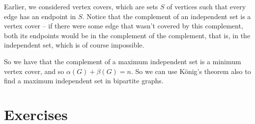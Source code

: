 \documentclass[nobib]{tufte-handout}
\begin{document}
\begin{remark}
    Earlier, we considered vertex covers, which are sets $S$ of vertices such that every edge has an endpoint in $S$. Notice that the complement of an independent set is a vertex cover -- if there were some edge that wasn't covered by this complement, both its endpoints would be in the complement of the complement, that is, in the independent set, which is of course impossible.

    So we have that the complement of a maximum independent set is a minimum vertex cover, and so $\alpha(G) + \beta(G) = n$. So we can use König's theorem also to find a maximum independent set in bipartite graphs.
\end{remark}
\section{Exercises}


%
%
\end{document}
